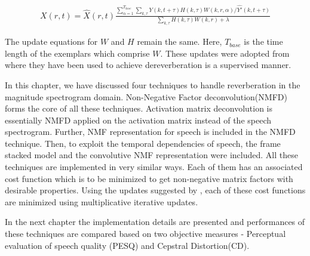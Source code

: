 \begin{align}X(r,t) = \hat{X}(r,t)\frac{\sum_{\alpha = 1}^{T_{base}}\sum_{k,\tau}Y(k,t + \tau)H(k,\tau)W(k,r,\alpha)/\hat{Y'}(k,t + \tau)}{\sum_{k,\tau}H(k,\tau)W(k,r) + \lambda}
\end{align}

The update equations for $W$ and $H$ remain the same. Here, $T_{base}$ is the time length of the exemplars which comprise $W$.  These updates were adopted from \cite{baby} where they have been used to achieve dereverberation is a supervised manner. 

In this chapter, we have discussed four techniques to handle reverberation in the magnitude spectrogram domain. Non-Negative Factor deconvolution(NMFD) forms the core of all these techniques. Activation matrix deconvolution is essentially NMFD applied on the activation matrix instead of the speech spectrogram. Further, NMF representation for speech is included in the NMFD technique. Then, to exploit the temporal dependencies of speech, the frame stacked model and the convolutive NMF representation  were included. All these techniques are implemented in very similar ways. Each of them has an associated cost function which is to be minimized to get non-negative matrix factors with desirable properties. Using the updates suggested by \cite{lee}, each of these cost functions are minimized using multiplicative iterative updates.

In the next chapter the implementation details are presented and performances  of these techniques are compared based on two objective measures - Perceptual evaluation of speech quality (PESQ) and Cepstral Distortion(CD).




















